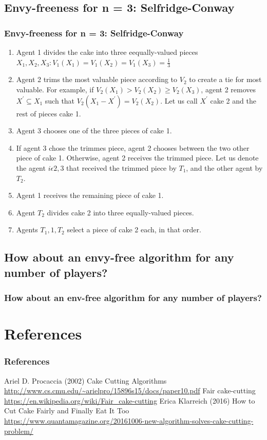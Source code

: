 \documentclass{beamer}
\begin{document}
\subsection{Envy-freeness for n = 3: Selfridge-Conway}
\begin{frame}
\frametitle{Envy-freeness for n = 3: Selfridge-Conway}
\begin{enumerate}
    \item Agent 1 divides the cake into three eequally-valued pieces $X_1, X_2, X_3: V_1(X_1)=V_1(X_2)=V_1(X_3)=\frac{1}{3}$
    \item Agent 2 trims the most valuable piece according to $V_2$ to create a tie for most valuable. For example, if $V_2(X_1)>V_2(X_2)\geq{V}_2(X_3)$, agent 2 removes $X^{'}\subseteq{X_1}$ such that $V_2(X_1-X^{'})=V_2(X_2)$. Let us call $X^{'}$ cake 2 and the rest of pieces cake 1.
    \item Agent 3 chooses one of the three pieces of cake 1.
    \item If agent 3 chose the trimmes piece, agent 2 chooses between the two other piece of cake 1. Otherwise, agent 2 receives the trimmed piece. Let us denote the agent $i\epsilon{2,3}$ that received the trimmed piece by $T_1$, and the other agent by $T_2$.
    \item Agent 1 receives the remaining piece of cake 1.
    \item Agent $T_2$ divides cake 2 into three equally-valued pieces.
    \item Agents $T_1,1,T_2$ select a piece of cake 2 each, in that order.
\end{enumerate}
\end{frame}

\subsection{How about an envy-free algorithm for any number of players?}
\begin{frame}
\frametitle{How about an env-free algorithm for any number of players?}
\end{frame}


\section{References}
\begin{frame}
\frametitle{References}
\footnotesize{
\begin{thebibliography}{99} %
 Ariel D. Procaccia (2002)
\newblock Cake Cutting Algorithms
\newblock \url{http://www.cs.cmu.edu/~arielpro/15896s15/docs/paper10.pdf}
 Fair cake-cutting
\newblock \url{https://en.wikipedia.org/wiki/Fair\_cake-cutting}
 Erica Klarreich (2016)
\newblock How to Cut Cake Fairly and Finally Eat It Too
\newblock \url{https://www.quantamagazine.org/20161006-new-algorithm-solves-cake-cutting-problem/}

\end{thebibliography}
}
\end{frame}
\end{document}
